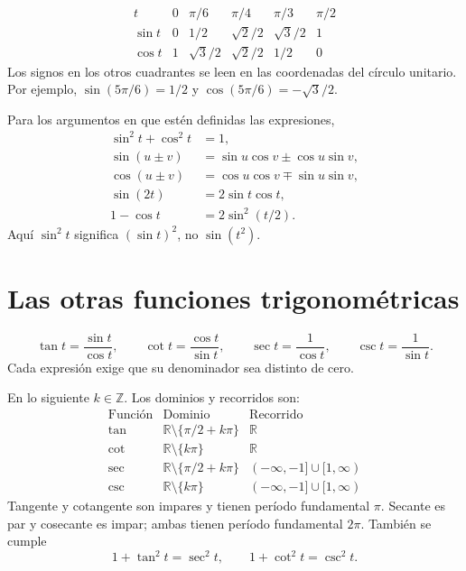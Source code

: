 \documentclass[10pt,a5paper]{article}
\begin{document}
\[
\begin{array}{c|ccccc}
  t&0&\pi/6&\pi/4&\pi/3&\pi/2\\ \hline
  \sin t&0&1/2&\sqrt2/2&\sqrt3/2&1\\
  \cos t&1&\sqrt3/2&\sqrt2/2&1/2&0
\end{array}
\]
Los signos en los otros cuadrantes se leen en las coordenadas del círculo unitario. Por ejemplo, $\sin(5\pi/6)=1/2$ y $\cos(5\pi/6)=-\sqrt3/2$.

\begin{proposicion}
Para los argumentos en que estén definidas las expresiones,
\begin{align*}
  \sin^2t+\cos^2t&=1,\\
  \sin(u\pm v)&=\sin u\cos v\pm\cos u\sin v,\\
  \cos(u\pm v)&=\cos u\cos v\mp\sin u\sin v,\\
  \sin(2t)&=2\sin t\cos t,\\
  1-\cos t&=2\sin^2(t/2).
\end{align*}
Aquí $\sin^2t$ significa $(\sin t)^2$, no $\sin(t^2)$.
\end{proposicion}

\section*{Las otras funciones trigonométricas}

\begin{definicion}
\[
  \tan t=\frac{\sin t}{\cos t},\qquad
  \cot t=\frac{\cos t}{\sin t},\qquad
  \sec t=\frac1{\cos t},\qquad
  \csc t=\frac1{\sin t}.
\]
Cada expresión exige que su denominador sea distinto de cero.
\end{definicion}

En lo siguiente $k\in\mathbb{Z}$. Los dominios y recorridos son:
\[
\begin{array}{c|c|c}
  \text{Función}&\text{Dominio}&\text{Recorrido}\\ \hline
  \tan&\mathbb{R}\setminus\{\pi/2+k\pi\}&\mathbb{R}\\
  \cot&\mathbb{R}\setminus\{k\pi\}&\mathbb{R}\\
  \sec&\mathbb{R}\setminus\{\pi/2+k\pi\}&(-\infty,-1]\cup[1,\infty)\\
  \csc&\mathbb{R}\setminus\{k\pi\}&(-\infty,-1]\cup[1,\infty)
\end{array}
\]
Tangente y cotangente son impares y tienen período fundamental $\pi$. Secante es par y cosecante es impar; ambas tienen período fundamental $2\pi$. También se cumple
\[
  1+\tan^2t=\sec^2t,\qquad 1+\cot^2t=\csc^2t.
\]
\end{document}
